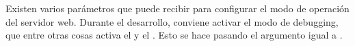 Existen varios parámetros que  puede recibir para configurar el
modo de operación del servidor web. Durante el desarrollo, conviene  activar
el modo de debugging, que entre otras cosas activa el  y el .
Esto se hace pasando el argumento  igual a  .








